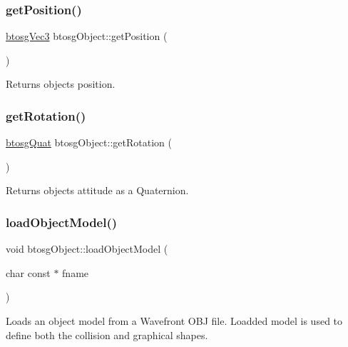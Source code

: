 \subsubsection{\texorpdfstring{get\+Position()}{getPosition()}}
{\footnotesize\ttfamily \hyperlink{classbtosgVec3}{btosg\+Vec3} btosg\+Object\+::get\+Position (\begin{DoxyParamCaption}{ }\end{DoxyParamCaption})\hspace{0.3cm}{\ttfamily [inline]}}

Returns object\textquotesingle{}s position. \mbox{\label{classbtosgObject_a3b825999ad3a51bde743d4085ff19dae}} 
\subsubsection{\texorpdfstring{get\+Rotation()}{getRotation()}}
{\footnotesize\ttfamily \hyperlink{classbtosgQuat}{btosg\+Quat} btosg\+Object\+::get\+Rotation (\begin{DoxyParamCaption}{ }\end{DoxyParamCaption})\hspace{0.3cm}{\ttfamily [inline]}}

Returns object\textquotesingle{}s attitude as a Quaternion. \mbox{\label{classbtosgObject_a91838b8235579da178fcc06e6d3d47f3}} 
\subsubsection{\texorpdfstring{load\+Object\+Model()}{loadObjectModel()}}
{\footnotesize\ttfamily void btosg\+Object\+::load\+Object\+Model (\begin{DoxyParamCaption}\item[{char const $\ast$}]{fname }\end{DoxyParamCaption})}

Loads an object model from a Wavefront O\+BJ file. Loadded model is used to define both the collision and graphical shapes. \mbox{\label{classbtosgObject_acfd70fa6477c80fd7f29ad7ab9f4f067}} 
